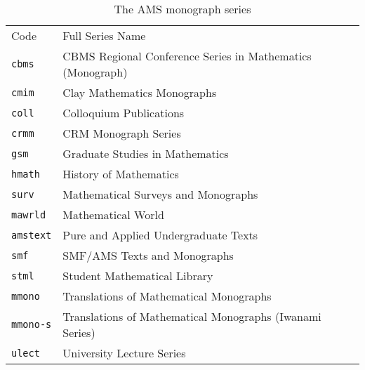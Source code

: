 
\begin{table}[h!]
\caption{The AMS monograph series}\label{tbl:series}
{\small
\renewcommand{\arraystretch}{.98}
\begin{tabular}{@{}lp{}}
Code & \hspace*{.75in}Full Series Name\\[.5pc]
\verb+cbms+&     CBMS Regional Conference Series in Mathematics (Monograph)\\
\verb+cmim+&     Clay Mathematics Monographs\\
\verb+coll+&     Colloquium Publications\\
\verb+crmm+&     CRM Monograph Series\\
\verb+gsm+&      Graduate Studies in Mathematics\\
\verb+hmath+&    History of Mathematics\\
\verb+surv+&     Mathematical Surveys and Monographs\\
\verb+mawrld+&   Mathematical World\\
\verb+amstext+&  Pure and Applied Undergraduate Texts\\
\verb+smf+&      SMF/AMS Texts and Monographs\\
\verb+stml+&     Student Mathematical Library\\
\verb+mmono+&    Translations of Mathematical Monographs\\
\verb+mmono-s+&  Translations of Mathematical Monographs (Iwanami Series)\\
\verb+ulect+&    University Lecture Series\\
\end{tabular}
}
\end{table}%
\endinput
